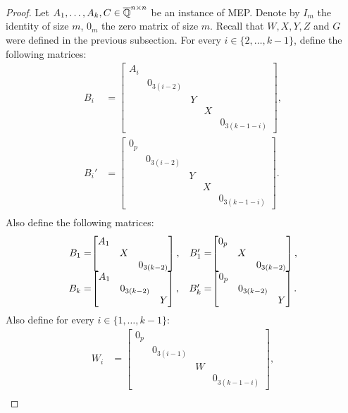 \begin{proof}
Let $A_1,\ldots,A_k,C\in\overline{\mathbb{Q}}^{n\times n}$ be an instance of MEP. Denote by $I_m$ the identity of size $m$,
$0_m$ the zero matrix of size $m$. Recall that $W,X,Y,Z$ and $G$ were defined in the previous
subsection. For every $i\in\{2,\ldots,k-1\}$, define the following matrices:
\begin{align*}
B_i&=\begin{bmatrix}A_i&&&&\\&0_{3(i-2)}&&&\\&&Y&&\\&&&X&\\&&&&0_{3(k-1-i)}\end{bmatrix},\\
B_i'&=\begin{bmatrix}0_p&&&&\\&0_{3(i-2)}&&&\\&&Y&&\\&&&X&\\&&&&0_{3(k-1-i)}\end{bmatrix}.\\
\end{align*}
Also define the following matrices:
\[
\begin{array}{r@{}c@{}cr@{}c}
B_1=&\begin{bmatrix}A_1&&\\&X&\\&&0_{3(k-2)}\end{bmatrix},&&
B_1'=&\begin{bmatrix}0_p&&\\&X&\\&&0_{3(k-2)}\end{bmatrix},\\
B_k=&\begin{bmatrix}A_1&&\\&0_{3(k-2)}&\\&&Y\end{bmatrix},&&
B_k'=&\begin{bmatrix}0_p&&\\&0_{3(k-2)}&\\&&Y\end{bmatrix}.\\
\end{array}\]
Also define for every $i\in\{1,\ldots,k-1\}$:
\begin{align*}
W_i&=\begin{bmatrix}0_p&&&\\&0_{3(i-1)}&&\\&&W&\\&&&0_{3(k-1-i)}\end{bmatrix},\\

\end{align*}
\end{proof}
